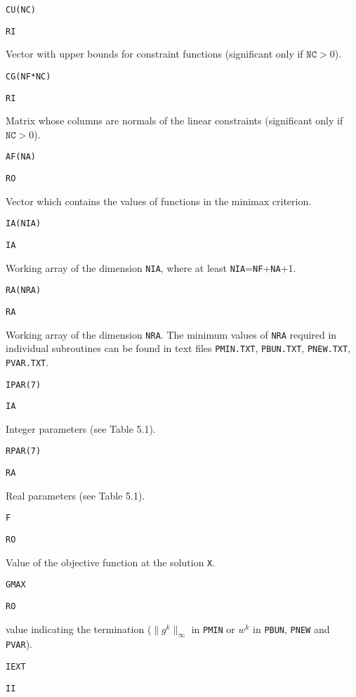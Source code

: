 \documentclass{article}
\begin{document}
{  \par\vspace{2mm}
\noindent\parbox{20mm}{\texttt{CU(NC)}}\parbox{10mm}{\texttt{RI}}\parbox[t]{91mm}{
  Vector with upper bounds for constraint functions
  (significant only if $\texttt{NC}>0$).}
  \par\vspace{2mm}
\noindent\parbox{20mm}{\texttt{CG(NF*NC)}}\parbox{10mm}{\texttt{RI}}\parbox[t]{91mm}{
  Matrix whose columns are normals of the linear constraints
  (significant only if $\texttt{NC}>0$).}
  \par\vspace{2mm}
\noindent\parbox{20mm}{\texttt{AF(NA)}}\parbox{10mm}{\texttt{RO}}\parbox[t]{91mm}{
  Vector which contains the values of functions in the minimax
  criterion.}
  \par\vspace{2mm}
\noindent\parbox{20mm}{\texttt{IA(NIA)}}\parbox{10mm}{\texttt{IA}}\parbox[t]{91mm}{
  Working array of the dimension \texttt{NIA}, where at least
  \texttt{NIA}=\texttt{NF}+\texttt{NA}+1.}
  \par\vspace{2mm}
\noindent\parbox{20mm}{\texttt{RA(NRA)}}\parbox{10mm}{\texttt{RA}}\parbox[t]{91mm}{
  Working array of the dimension \texttt{NRA}. The minimum
  values of \texttt{NRA} required in individual subroutines can be found in
  text files {\tt PMIN.TXT}, {\tt PBUN.TXT}, {\tt PNEW.TXT}, {\tt PVAR.TXT}.}
  \par\vspace{2mm}
\noindent\parbox{20mm}{\texttt{IPAR(7)}}\parbox{10mm}{\texttt{IA}}\parbox[t]{91mm}{
  Integer parameters (see Table 5.1).}
  \par\vspace{2mm}
\noindent\parbox{20mm}{\texttt{RPAR(7)}}\parbox{10mm}{\texttt{RA}}\parbox[t]{91mm}{
  Real parameters (see Table 5.1).}
  \par\vspace{2mm}
\noindent\parbox{20mm}{\texttt{F}}\parbox{10mm}{\texttt{RO}}\parbox[t]{91mm}{
  Value of the objective function at the solution \texttt{X}.}
  \par\vspace{2mm}
\noindent\parbox{20mm}{\texttt{GMAX}}\parbox{10mm}{\texttt{RO}}\parbox[t]{91mm}{
  value indicating the termination ($\|g^k\|_{\infty}$ in {\tt PMIN}
  or $w^k$ in {\tt PBUN}, {\tt PNEW} and {\tt PVAR}).}
  \par\vspace{2mm}
\noindent\parbox{20mm}{\texttt{IEXT}}\parbox{10mm}{\texttt{II}}\parbox[t]{91mm}{
}}
\end{document}
